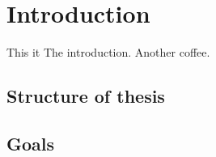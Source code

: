 \chapter{Introduction}

This it The introduction.
Another coffee.

\newpage
\section{Structure of thesis}
\section{Goals}
